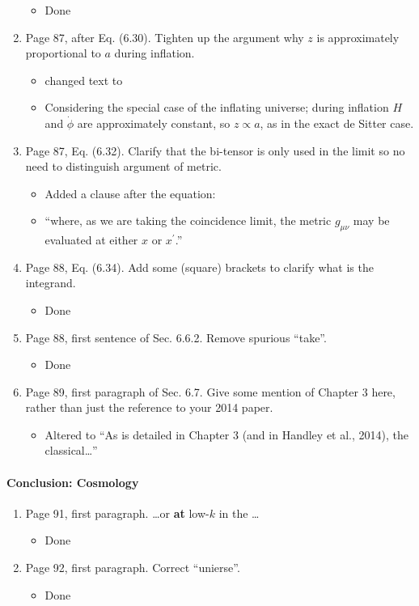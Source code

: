 \documentclass[11pt]{article}
\begin{document}
\begin{enumerate}
    \begin{itemize}
        \item Done
    \end{itemize}
\item Page 87, after Eq. (6.30). Tighten up the argument why $z$ is
  approximately proportional to $a$ during inflation.
  \begin{itemize}
      \item changed text to
      \item Considering the special case of the inflating universe; during inflation \(H\) and \(\dot{\phi}\) are approximately constant, so \(z\propto a\), as in the exact de Sitter case.
  \end{itemize}
\item Page 87, Eq. (6.32). Clarify that the bi-tensor is only used in
  the limit so no need to distinguish argument of metric.
  \begin{itemize}
      \item Added a clause after the equation:
        \item ``where, as we are taking the coincidence limit, the metric \(g_{\mu\nu}\) may be evaluated at either \(x\) or \(x^\prime\).''
  \end{itemize}
\item Page 88, Eq. (6.34). Add some (square) brackets to clarify what
  is the integrand.
  \begin{itemize}
      \item Done
  \end{itemize}
\item Page 88,  first sentence of Sec. 6.6.2. Remove spurious
  ``take''.
  \begin{itemize}
      \item Done
  \end{itemize}
\item Page 89, first paragraph of Sec. 6.7. Give some mention of
  Chapter 3 here, rather than just the reference to your 2014 paper. 
  \begin{itemize}
      \item Altered to ``As is detailed in Chapter 3 (and in Handley et al., 2014), the classical\ldots''
  \end{itemize}
\end{enumerate}

\paragraph{Conclusion: Cosmology}
\begin{enumerate}
\item Page 91, first paragraph. \ldots or \textbf{at} low-$k$ in the
  \ldots
  \begin{itemize}
      \item Done
  \end{itemize}
\item Page 92, first paragraph. Correct ``unierse''.
    \begin{itemize}
        \item Done
    \end{itemize}
\end{enumerate}
\end{document}

